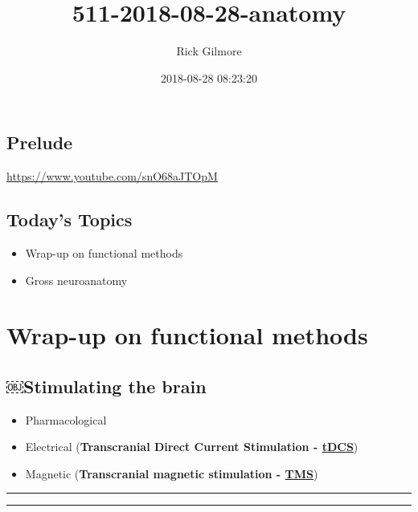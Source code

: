 \documentclass[]{article}
\title{511-2018-08-28-anatomy}
\author{Rick Gilmore}
\date{2018-08-28 08:23:20}
\providecommand{\tightlist}{%
  \setlength{\itemsep}{0pt}\setlength{\parskip}{0pt}}
\begin{document}
\maketitle

{
\setcounter{tocdepth}{1}
\tableofcontents
}
\subsection{Prelude}\label{prelude}

\url{https://www.youtube.com/snO68aJTOpM}

\subsection{Today's Topics}\label{todays-topics}

\begin{itemize}
\tightlist
\item
  Wrap-up on functional methods
\item
  Gross neuroanatomy
\end{itemize}

\section{Wrap-up on functional
methods}\label{wrap-up-on-functional-methods}

\subsection{￼Stimulating the brain}\label{stimulating-the-brain}

\begin{itemize}
\tightlist
\item
  Pharmacological
\item
  Electrical (\textbf{Transcranial Direct Current Stimulation -
  \href{https://en.wikipedia.org/wiki/Transcranial_direct-current_stimulation}{tDCS}})
\item
  Magnetic (\textbf{Transcranial magnetic stimulation -
  \href{https://en.wikipedia.org/wiki/Transcranial_magnetic_stimulation}{TMS}})
\end{itemize}

\begin{center}\rule{0.5\linewidth}{\linethickness}\end{center}

\begin{center}\rule{0.5\linewidth}{\linethickness}\end{center}
\end{document}
